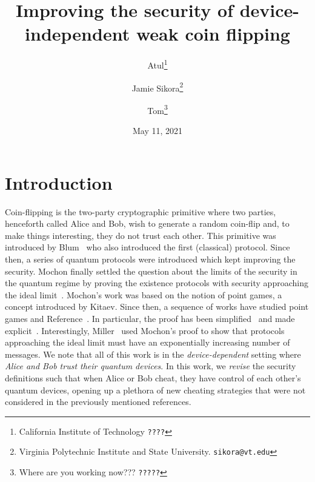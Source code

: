 \documentclass[11pt]{article}
\begin{document}
\title{\bf \vspace{-2cm}
Improving the security of device-independent weak coin flipping
}

\author{ 
Atul\thanks{California Institute of Technology \tt{????}}
\and
Jamie Sikora\thanks{Virginia Polytechnic Institute and State University. \tt{sikora@vt.edu}}
\and
Tom\thanks{Where are you working now??? \tt{?????}}}

\date{May 11, 2021}

\maketitle 


\vspace{-1cm}

\section{Introduction}  
Coin-flipping is the two-party cryptographic primitive where two parties, henceforth called Alice and Bob, wish to generate a random coin-flip and, to make things interesting, they do not trust each other. 
This primitive was introduced by Blum~\cite{???} who also introduced the first (classical) protocol.  
Since then, a series of quantum protocols were introduced which kept improving the security. 
Mochon finally settled the question about the limits of the security in the quantum regime by proving the existence protocols with security approaching the ideal limit~\cite{Moc07}. 
Mochon's work was based on the notion of point games, a concept introduced by Kitaev. 
Since then, a sequence of works have studied point games and Reference~\cite{Moc07}. 
In particular, the proof has been simplified~\cite{???} and made explicit~\cite{???}. 
Interestingly, Miller~\cite{???} used Mochon's proof to show that protocols approaching the ideal limit must have an exponentially increasing number of messages. 
We note that all of this work is in the \emph{device-dependent} setting where \emph{Alice and Bob trust their quantum devices}. 
In this work, we \emph{revise} the security definitions such that when Alice or Bob cheat, they have control of each other's quantum devices, opening up a plethora of new cheating strategies that were not considered in the previously mentioned references. 
\end{document}
